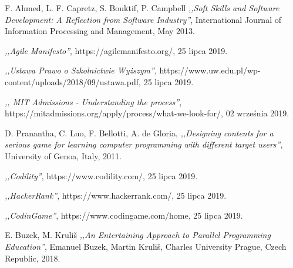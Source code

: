 
\begin{thebibliography}{99}


 F. Ahmed, L. F. Capretz, S. Bouktif, P. Campbell \emph{,,Soft Skills and Software Development: A Reflection from Software Industry''}, International Journal of Information Processing and Management, May 2013.

 \emph{,,Agile Manifesto''}, \newline [Online] https://agilemanifesto.org/, 25 lipca 2019.

 \emph{,,Ustawa Prawo o Szkolnictwie Wyższym''}, \newline [Online] https://www.uw.edu.pl/wp-content/uploads/2018/09/ustawa.pdf, 25 lipca 2019.

 \emph{,, MIT Admissions - Understanding the process''}, \newline [Online] https://mitadmissions.org/apply/process/what-we-look-for/, 02 września 2019.

 D. Pranantha, C. Luo, F. Bellotti, A. de Gloria,  \emph{,,Designing contents for a serious game for learning computer programming with different target users''}, University of Genoa, Italy, 2011.

 \emph{,,Codility''}, \newline [Online] https://www.codility.com/, 25 lipca 2019.

 \emph{,,HackerRank''}, \newline [Online] https://www.hackerrank.com/, 25 lipca 2019.

 \emph{,,CodinGame''}, \newline [Online] https://www.codingame.com/home, 25 lipca 2019.

 E. Buzek, M. Kruliš \emph{,,An Entertaining Approach to Parallel Programming Education''}, Emanuel Buzek, Martin Kruliš, Charles University Prague, Czech Republic, 2018.


\end{thebibliography}
